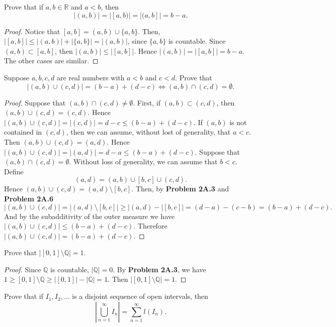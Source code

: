 \documentclass[14.5pt]{article}
\newcommand{\Q}{\mathbb{Q}}
\newcommand{\R}{\mathbb{R}}
\newenvironment{problem}[2][Problem]{\begin{mdframed}[backgroundcolor=gray!10, leftline = false, rightline=false, linewidth=0.25pt]  \begin{trivlist}
\item[\hskip \labelsep {\bfseries #1}\hskip \labelsep {\bfseries #2.}]}{\end{trivlist} \end{mdframed}  }
\begin{document}
\begin{problem}{2A.6} Prove that if $a, b \in \R$ and $a < b$, then
$$|(a,b)| = |[a,b)| = |(a, b]| = b - a.$$
\end{problem}
\begin{proof}
    Notice that $[a,b] = (a, b) \cup \{a, b\}$. Then, $|[a,b]| \leq |(a,b)| + |\{a,b\}| = |(a,b)|$, since $\{a,b\}$ is countable. Since $(a,b) \subset [a,b]$, then $|(a,b)| \leq |[a,b]|.$ Hence $|(a,b)| = |[a,b]| = b - a.$ The other cases are similar. 
\end{proof}

\begin{problem}{2A.7} Suppose $a,b,c,d$ are real numbers with $a < b $ and $c < d.$ Prove that
$$|(a,b) \cup (c, d)| = (b-a) + (d-c) \iff (a, b) \cap (c,d) = \emptyset.$$
\end{problem}
\begin{proof}
    Suppose that $ (a, b) \cap (c,d) \neq \emptyset.$ First, if $(a,b) \subset (c,d)$, then $(a,b) \cup (c,d) = (c,d)$. Hence $|(a,b) \cup (c, d)| = |(c, d)| = d-c \leq (b-a) + (d-c).$ If $(a,b)$ is not contained in $(c,d)$, then we can assume, without lost of generality, that $a < c.$ Then $(a,b) \cup (c, d) = (a,d)$. Hence $|(a,b) \cup (c, d)| = | (a,d) | = d - a \leq (b-a) + (d - c)$.
    Suppose that $ (a, b) \cap (c,d) = \emptyset.$ Without loss of generality, we can assume that $b < c$. Define 
    $$(a, d) = (a, b) \cup [b,c] \cup (c, d).$$
    Hence $(a,b) \cup (c,d) = (a,d) \setminus [b,c]$. Then, by \textbf{Problem 2A.3} and \textbf{Problem 2A.6}
    $$|(a,b) \cup (c,d) | = |(a,d) \setminus [b,c]| \geq |(a,d) - |[b,c]| = (d-a) - (c-b) = (b-a) + (d-c).$$
    And by the subadditivity of the outer measure we have $|(a,b) \cup (c,d) |  \leq (b-a) + (d-c)$. Therefore $|(a,b) \cup (c,d) | = (b-a) + (d-c)$.
    
\end{proof}

\begin{problem}{2A.10} Prove that $| [0,1] \setminus \Q | = 1.$
\end{problem}
\begin{proof}
    Since $\Q$ is countable, $| \Q | = 0$. By \textbf{Problem 2A.3}, we have $1 \geq [0,1] \setminus \Q \geq |[0,1]| - | \Q | = 1$. Then $|[0,1] \setminus \Q | = 1.$
\end{proof}

\begin{problem}{2A.11} Prove that if $I_1, I_2, \ldots$ is a disjoint sequence of open intervals, then 
$$\left\lvert \bigcup_{n=1}^\infty I_n\right\rvert = \sum_{n=1}^\infty l(I_n).$$
\end{problem}
\end{document}
